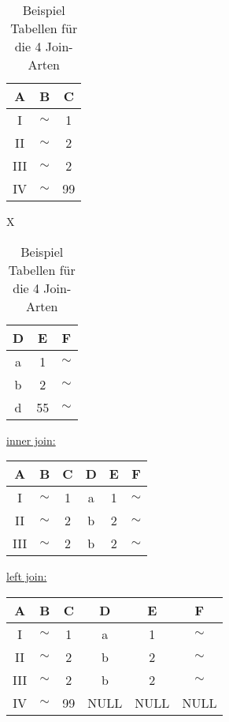 \documentclass{article}
\begin{document}
\begin{table}[!htbp]
  \center
  \begin{tabular}{c|c|c}
    A            & B      & C  \\
    \hline
    \textrm{I}   & $\sim$ & 1  \\
    \textrm{II}  & $\sim$ & 2  \\
    \textrm{III} & $\sim$ & 2  \\
    \textrm{IV}  & $\sim$ & 99 \\
  \end{tabular}
  \quad
  X
  \quad
  \begin{tabular}{c|c|c}
    D & E  & F      \\
    \hline
    a & 1  & $\sim$ \\
    b & 2  & $\sim$ \\
    d & 55 & $\sim$ \\
  \end{tabular}
  \label{tab:joins:1}
  \caption{Beispiel Tabellen für die 4 Join-Arten}
\end{table}

\begin{table}[!htbp]
  \center
  \underline{inner join:}
  \quad
  \quad
  \begin{tabular}{c|c|c|c|c|c}
    A            & B      & C & D & E & F      \\
    \hline
    \textrm{I}   & $\sim$ & 1 & a & 1 & $\sim$ \\
    \textrm{II}  & $\sim$ & 2 & b & 2 & $\sim$ \\
    \textrm{III} & $\sim$ & 2 & b & 2 & $\sim$ \\
  \end{tabular}
  \label{tab:joins:2}
\end{table}

\begin{table}[!htbp]
  \center
  \underline{left join:}
  \quad
  \quad
  \begin{tabular}{c|c|c|c|c|c}
    A            & B      & C  & D    & E    & F      \\
    \hline
    \textrm{I}   & $\sim$ & 1  & a    & 1    & $\sim$ \\
    \textrm{II}  & $\sim$ & 2  & b    & 2    & $\sim$ \\
    \textrm{III} & $\sim$ & 2  & b    & 2    & $\sim$ \\
    \textrm{IV}  & $\sim$ & 99 & NULL & NULL & NULL   \\
  \end{tabular}
  \label{tab:joins:3}
\end{table}
\end{document}
